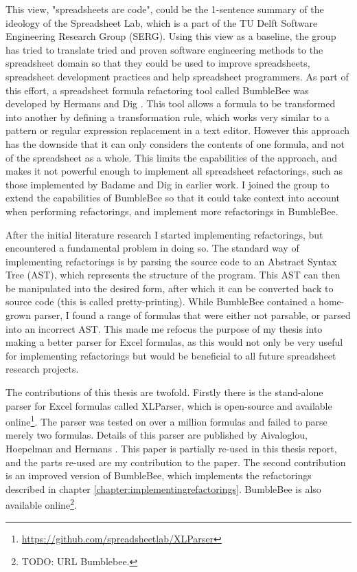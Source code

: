 \documentclass[12pt,a4paper,onecolumn,oneside]{memoir}
\begin{document}
This view, "spreadsheets are code", could be the 1-sentence summary of the ideology of the Spreadsheet Lab, which is a part of the TU Delft Software Engineering Research Group (SERG).
Using this view as a baseline, the group has tried to translate tried and proven software engineering methods to the spreadsheet domain so that they could be used to improve spreadsheets, spreadsheet development practices and help spreadsheet programmers.
As part of this effort, a spreadsheet formula refactoring tool called BumbleBee was developed by Hermans and Dig \cite{hermans2014bumblebee}.
This tool allows a formula to be transformed into another by defining a transformation rule, which works very similar to a pattern or regular expression replacement in a text editor.
However this approach has the downside that it can only considers the contents of one formula, and not of the spreadsheet as a whole.
This limits the capabilities of the approach, and makes it not powerful enough to implement all spreadsheet refactorings, such as those implemented by Badame and Dig \cite{badame2012refactoring} in earlier work.
I joined the group to extend the capabilities of BumbleBee so that it could take context into account when performing refactorings, and implement more refactorings in BumbleBee.

\vspace{0.3em}

After the initial literature research I started implementing refactorings, but encountered a fundamental problem in doing so.
The standard way of implementing refactorings is by parsing the source code to an Abstract Syntax Tree (AST), which represents the structure of the program.
This AST can then be manipulated into the desired form, after which it can be converted back to source code (this is called pretty-printing).
While BumbleBee contained a home-grown parser, I found a range of formulas that were either not parsable, or parsed into an incorrect AST.
This made me refocus the purpose of my thesis into making a better parser for Excel formulas, as this would not only be very useful for implementing refactorings but would be beneficial to all future spreadsheet research projects.

The contributions of this thesis are twofold. Firstly there is the stand-alone parser for Excel formulas called XLParser, which is open-source and available online\footnote{\url{https://github.com/spreadsheetlab/XLParser}}. The parser was tested on over a million formulas and failed to parse merely two formulas.
Details of this parser are published by Aivaloglou, Hoepelman and Hermans \cite{xlparser}.
This paper is partially re-used in this thesis report, and the parts re-used are my contribution to the paper.
The second contribution is an improved version of BumbleBee, which implements the refactorings described in chapter \ref{chapter:implementingrefactorings}.
BumbleBee is also available online\footnote{TODO: URL Bumblebee.}.
\end{document}
